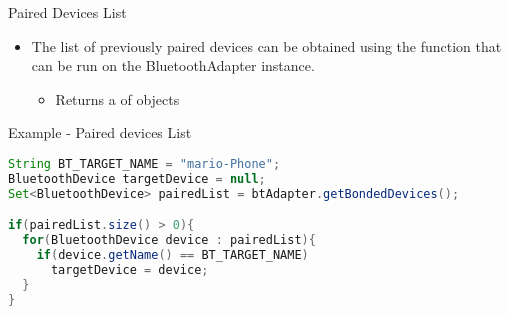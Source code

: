 \documentclass{beamer}
\begin{document}
  \begin{frame}[fragile]{Paired Devices List}
    \begin{itemize}
      \item The list of previously paired devices can be obtained using the
       function that can be run on the
      BluetoothAdapter instance.
      \begin{itemize}
        \item Returns a  of  objects 
      \end{itemize}
    \end{itemize}

    \begin{exampleblock}{Example - Paired devices List}
      \begin{lstlisting}[language=Java]
String BT_TARGET_NAME = "mario-Phone";
BluetoothDevice targetDevice = null;
Set<BluetoothDevice> pairedList = btAdapter.getBondedDevices();

if(pairedList.size() > 0){
  for(BluetoothDevice device : pairedList){
    if(device.getName() == BT_TARGET_NAME)
      targetDevice = device;
  }
}
      \end{lstlisting}
    \end{exampleblock}
  \end{frame}
\end{document}
